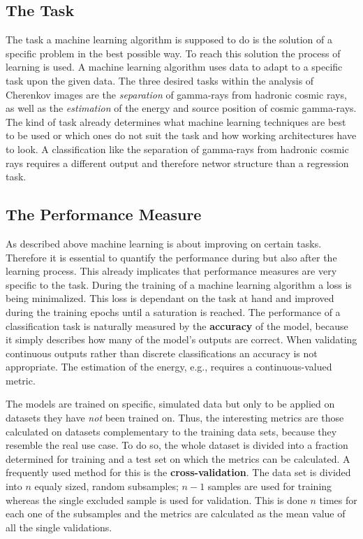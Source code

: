 \subsection{The Task}
%
The task a machine learning algorithm is supposed to do is the solution of a
specific problem in the best possible way. To reach this solution the process
of learning is used. A machine learning algorithm uses data to adapt to a specific task upon the given data. The three desired tasks
within the analysis of Cherenkov images are the \textit{separation} of
gamma-rays from hadronic cosmic rays, as well as the \textit{estimation} of the
energy and source position of cosmic gamma-rays. The kind of task already
determines what machine learning techniques are best to be used or which ones
do not suit the task and how working architectures have to look. A
classification like the separation of gamma-rays from hadronic cosmic rays
requires a different output and therefore networ structure than a regression
task.

\subsection{The Performance Measure}
%
As described above machine learning is about improving on certain tasks.
Therefore it is essential to quantify the performance during but also after the
learning process. This already implicates that performance measures are very
specific to the task. During the training of a machine learning algorithm a
loss is being minimalized. This loss is dependant on the task at hand and improved during the training epochs until a saturation is reached. The performance of a classification task is naturally
measured by the \textbf{accuracy} of the model, because it simply describes how
many of the model's outputs are correct. When validating continuous outputs
rather than discrete classifications an accuracy is not appropriate. The
estimation of the energy, e.g., requires a continuous-valued metric.

The models are trained on specific, simulated data but only to be applied on
datasets they have \textit{not} been trained on. Thus, the interesting metrics
are those calculated on datasets complementary to the training data sets,
because they resemble the real use case. To do so, the whole dataset is divided
into a fraction determined for training and a test set on which the metrics can
be calculated. A frequently used method for this is the
\textbf{cross-validation}. The data set is divided into $n$ equaly sized, random
subsamples; $n-1$ samples are used for training whereas the single excluded
sample is used for validation. This is done $n$ times for each one of the
subsamples and the metrics are calculated as the mean value of all the single
validations.

